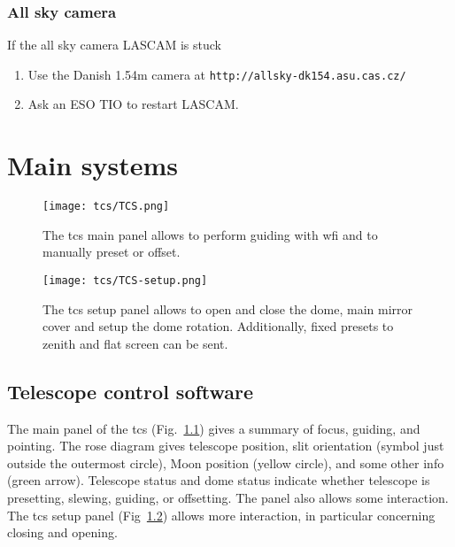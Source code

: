 \documentclass[11pt,fleqn]{book} %
\begin{document}
\subsection{All sky camera}
If the all sky camera LASCAM is stuck
\begin{enumerate}
  \item Use the Danish 1.54m camera at \texttt{http://allsky-dk154.asu.cas.cz/}
       \texttt{}
  \item Ask an ESO TIO to restart LASCAM.
\end{enumerate}



\chapter{Main systems}
\label{compo}


\begin{figure}[!ht]
\centering
\texttt{[image: tcs/TCS.png]}
\caption[Main panel of the telescope control software]{The \gls{tcs} main panel allows to perform guiding with \gls{wfi} and to manually preset or offset.}
\label{fig:tcs}
\end{figure}

\begin{figure}[!ht]
\centering
\texttt{[image: tcs/TCS-setup.png]}
\caption[Setup panel of the telescope control software]{The \gls{tcs} setup panel allows to open and close the dome, main
mirror cover and setup the dome rotation.  Additionally, fixed presets
to zenith and flat screen can be sent.}
\label{fig:tcssetup}
\end{figure}

\section{Telescope control software}

The main panel of the \gls{tcs} (Fig.~\ref{fig:tcs}) gives a summary of focus,
guiding, and pointing. The rose diagram gives telescope position, slit
orientation (symbol just outside the outermost circle), Moon position (yellow
circle), and some other info (green arrow). Telescope status and dome status
indicate whether telescope is presetting, slewing, guiding, or offsetting.  The
panel also allows some interaction.  The \gls{tcs} setup panel
(Fig~\ref{fig:tcssetup}) allows more interaction, in particular concerning
closing and opening.
\end{document}
